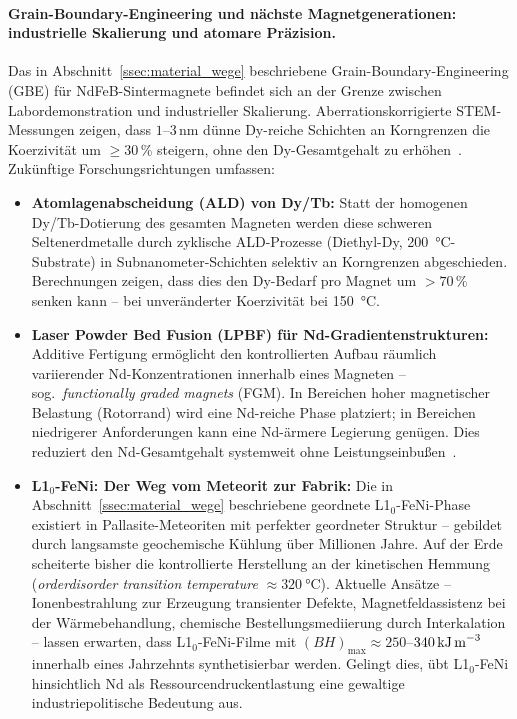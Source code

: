 ﻿\documentclass[12pt, a4paper]{report}
\theoremstyle{definition}
\theoremstyle{remark}
\begin{document}
\paragraph{Grain-Boundary-Engineering und nächste Magnetgenerationen:
industrielle Skalierung und atomare Präzision.}
Das in Abschnitt~\ref{ssec:material_wege} beschriebene
Grain-Boundary-Engineering (GBE) für NdFeB-Sintermagnete befindet sich
an der Grenze zwischen Labordemonstration und industrieller Skalierung.
Aberrationskorrigierte STEM-Messungen zeigen, dass $1$--$3\,\text{nm}$
dünne Dy-reiche Schichten an Korngrenzen die Koerzivität um $\geq 30\,\%$
steigern, ohne den Dy-Gesamtgehalt zu erhöhen~\cite{sepehriamin2012}.
Zukünftige Forschungsrichtungen umfassen:

\begin{itemize}
  \item \textbf{Atomlagenabscheidung (ALD) von Dy/Tb:}
    Statt der homogenen Dy/Tb-Dotierung des gesamten Magneten werden
    diese schweren Seltenerdmetalle durch zyklische
    ALD-Prozesse (Di\-ethyl-Dy, \SI{200}{\celsius}-Substrate) in Subnanometer-Schichten
    selektiv an Korngrenzen abgeschieden. Berechnungen zeigen, dass dies den
    Dy-Bedarf pro Magnet um $>70\,\%$ senken kann -- bei unveränderter
    Koerzivität bei \SI{150}{\celsius}.

  \item \textbf{Laser Powder Bed Fusion (LPBF) für Nd-Gradientenstrukturen:}
    Additive Fertigung ermöglicht den kontrollierten Aufbau räumlich
    variierender Nd-Konzentrationen innerhalb eines Magneten -- sog.\
    \emph{functionally graded magnets} (FGM). In Bereichen hoher
    magnetischer Belastung (Rotorrand) wird eine Nd-reiche Phase platziert;
    in Bereichen niedrigerer Anforderungen kann eine Nd-ärmere Legierung
    genügen. Dies reduziert den Nd-Gesamtgehalt systemweit ohne
    Leistungseinbußen~\cite{nakamura2018}.

  \item \textbf{L1$_0$-FeNi: Der Weg vom Meteorit zur Fabrik:}
    Die in Abschnitt~\ref{ssec:material_wege} beschriebene
    geordnete L1$_0$-FeNi-Phase existiert in Pallasite-Meteoriten mit
    perfekter geordneter Struktur -- gebildet durch langsamste geochemische
    Kühlung über Millionen Jahre. Auf der Erde scheiterte bisher die
    kontrollierte Herstellung an der kinetischen Hemmung (\emph{orderdisorder
    transition temperature} $\approx \SI{320}{\celsius}$). Aktuelle Ansätze --
    Ionenbestrahlung zur Erzeugung transienter Defekte, Magnetfeldassistenz
    bei der Wärmebehandlung, chemische Bestellungsmediierung durch Interkalation
    -- lassen erwarten, dass L1$_0$-FeNi-Filme mit $(BH)_{\max} \approx
    250$--$340\,\text{kJ\,m}^{-3}$ innerhalb eines Jahrzehnts synthetisierbar
    werden. Gelingt dies, übt L1$_0$-FeNi hinsichtlich Nd als
    Ressourcendruckentlastung eine gewaltige industriepolitische Bedeutung aus.


\end{itemize}
\end{document}
